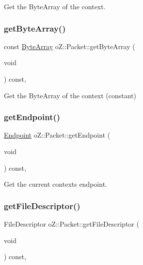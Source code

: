 Get the Byte\+Array of the context. 

\mbox{\label{classo_z_1_1_packet_a4919e1356309ad8c9d7595052d0ca498}} 
\subsubsection{\texorpdfstring{getByteArray()}{getByteArray()}\hspace{0.1cm}{\footnotesize\ttfamily [2/2]}}
{\footnotesize\ttfamily const \mbox{\hyperlink{namespaceo_z_abfa3f5a46e5c7584615dc1dd33fcafb6}{Byte\+Array}} o\+Z\+::\+Packet\+::get\+Byte\+Array (\begin{DoxyParamCaption}\item[{void}]{ }\end{DoxyParamCaption}) const\hspace{0.3cm}{\ttfamily [inline]}, {\ttfamily [noexcept]}}



Get the Byte\+Array of the context (constant) 

\mbox{\label{classo_z_1_1_packet_a89367cc491fdfdb6bf88eda9bc4eb219}} 
\subsubsection{\texorpdfstring{getEndpoint()}{getEndpoint()}}
{\footnotesize\ttfamily \mbox{\hyperlink{classo_z_1_1_endpoint}{Endpoint}} o\+Z\+::\+Packet\+::get\+Endpoint (\begin{DoxyParamCaption}\item[{void}]{ }\end{DoxyParamCaption}) const\hspace{0.3cm}{\ttfamily [inline]}, {\ttfamily [noexcept]}}



Get the current context\textquotesingle{}s endpoint. 

\mbox{\label{classo_z_1_1_packet_a65cfd7021de4eaf78f716143b82cd4a1}} 
\subsubsection{\texorpdfstring{getFileDescriptor()}{getFileDescriptor()}}
{\footnotesize\ttfamily File\+Descriptor o\+Z\+::\+Packet\+::get\+File\+Descriptor (\begin{DoxyParamCaption}\item[{void}]{ }\end{DoxyParamCaption}) const\hspace{0.3cm}{\ttfamily [inline]}, {\ttfamily [noexcept]}}




